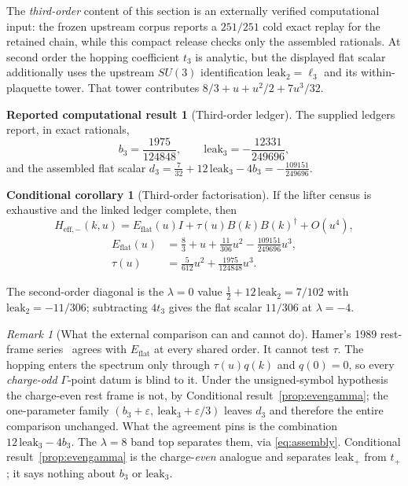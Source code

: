 \documentclass[11pt]{article}
\theoremstyle{plain}
\theoremstyle{definition}
\newtheorem{reported}[theorem]{Reported computational result}
\newtheorem{conditional}[theorem]{Conditional corollary}
\theoremstyle{remark}
\newtheorem{remark}[theorem]{Remark}
\newcommand{\chk}[1]{}
\newcommand{\dg}{^{\dagger}}
\begin{document}
The \emph{third-order} content of this section is an externally verified
computational input: the frozen upstream corpus reports a $251/251$ cold exact
replay for the retained chain, while this compact release checks only the
assembled rationals. At second order the hopping coefficient $t_3$ is analytic,
but the displayed flat scalar additionally uses the upstream $SU(3)$
identification $\mathrm{leak}_2=\ell_3$ and its within-plaquette tower. That
tower contributes $8/3+u+u^2/2+7u^3/32$.

\begin{reported}[Third-order ledger]\label{rep:su3}
The supplied ledgers report, in exact rationals,
\[
  b_3=\frac{1975}{124848},\qquad
  \mathrm{leak}_3=-\frac{12331}{249696},
\]
and the assembled flat scalar
$d_3=\tfrac7{32}+12\,\mathrm{leak}_3-4b_3=-\tfrac{109151}{249696}$.
\end{reported}
\chk{d\_3 = 7/32 + 12*leak\_3 - 4*b\_3}
\chk{leak\_3 is assembled from the domino diagonal and the vacuum piece}

\begin{conditional}[Third-order factorisation]\label{cor:su3}
If the lifter census is exhaustive and the linked ledger complete, then
\[
  H_{\mathrm{eff},-}(k,u)=E_{\mathrm{flat}}(u)I+\tau(u)B(k)B(k)\dg+O(u^4),
\]
\[
  \begin{aligned}
    E_{\mathrm{flat}}(u)&=\tfrac83+u+\tfrac{11}{306}u^2-\tfrac{109151}{249696}u^3,\\
    \tau(u)&=\tfrac5{612}u^2+\tfrac{1975}{124848}u^3 .
  \end{aligned}
\]
\end{conditional}
\chk{E\_flat and t(u) carry the ledger coefficients}

The second-order diagonal is the $\lambda=0$ value
$\tfrac12+12\,\mathrm{leak}_2=7/102$ with $\mathrm{leak}_2=-11/306$;
subtracting $4t_3$ gives the flat scalar $11/306$ at $\lambda=-4$.
\chk{d\_- = 1/2 + 12*leak\_2, and leak\_2 = -11/306}

\begin{remark}[What the external comparison can and cannot do]
Hamer's 1989 rest-frame series~\cite{Hamer1989} agrees with $E_{\mathrm{flat}}$
at every shared order. It cannot test $\tau$. The hopping enters the spectrum
only through $\tau(u)q(k)$ and $q(0)=0$, so every \emph{charge-odd}
$\Gamma$-point datum is blind to it. Under the unsigned-symbol hypothesis the
charge-even rest frame is not, by Conditional result~\ref{prop:evengamma}; the one-parameter family
$(b_3+\varepsilon,\ \mathrm{leak}_3+\varepsilon/3)$ leaves $d_3$ and therefore
the entire comparison unchanged. What the agreement pins is the combination
$12\,\mathrm{leak}_3-4b_3$. The $\lambda=8$ band top separates them, via \eqref{eq:assembly}.
Conditional result~\ref{prop:evengamma} is the charge-\emph{even} analogue and
separates $\mathrm{leak}_+$ from $t_+$; it says nothing about $b_3$ or
$\mathrm{leak}_3$.
\chk{FINDING: no Gamma-point datum can constrain the hopping}
\end{remark}
\end{document}
